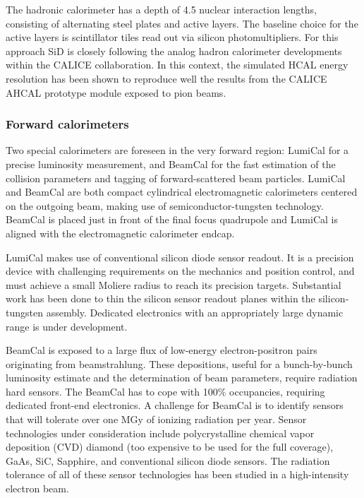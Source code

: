 The hadronic
calorimeter has a depth of 4.5 nuclear interaction lengths, consisting of
alternating steel plates and active layers. The baseline choice for the active
layers is scintillator tiles read out via silicon photomultipliers. For this approach SiD is closely following the analog hadron calorimeter developments within the CALICE collaboration. In this context, the simulated HCAL energy resolution has been shown to reproduce well the results from the CALICE AHCAL prototype module exposed to pion beams.

\subsubsection{Forward calorimeters}
\label{susub:det:forward}
Two special calorimeters are foreseen in the very forward region: LumiCal for a precise luminosity measurement, and BeamCal for the fast estimation of the collision parameters and tagging of forward-scattered beam particles. LumiCal and BeamCal are both compact cylindrical electromagnetic calorimeters centered on the outgoing beam, making use of semiconductor-tungsten technology. BeamCal is placed just in front of the final focus quadrupole and LumiCal is aligned with the electromagnetic calorimeter endcap. 

LumiCal makes use of conventional silicon diode sensor readout. It is a precision device with challenging requirements on the mechanics and position control, and must achieve a small Moliere radius to reach its precision targets. Substantial work has been done to thin the silicon sensor readout planes within the silicon-tungsten assembly. Dedicated electronics with an appropriately large dynamic range is under development.

BeamCal is exposed to a large flux of low-energy electron-positron pairs originating from beamstrahlung. These depositions, useful for a bunch-by-bunch luminosity estimate and the determination of beam parameters, require radiation hard sensors. The BeamCal has to cope with 100\% occupancies, requiring dedicated front-end electronics. A challenge for BeamCal is to identify sensors that will tolerate over one MGy of ionizing radiation per year. Sensor technologies under consideration include polycrystalline chemical vapor deposition (CVD) diamond (too expensive to be used for the full coverage), GaAs, SiC, Sapphire, and conventional silicon diode sensors. The radiation tolerance of all of these sensor technologies has been studied in a high-intensity electron beam. 


